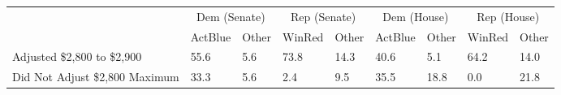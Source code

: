 \begin{tabular}{lll|ll|ll|ll}
  & \multicolumn{2}{c}{Dem (Senate)}& \multicolumn{2}{c}{Rep (Senate)}& \multicolumn{2}{c}{Dem (House)}& \multicolumn{2}{c}{Rep (House)}\\  & ActBlue & Other & WinRed & Other & ActBlue & Other & WinRed & Other \\ 
  \midrule
Adjusted \$2,800 to \$2,900 & 55.6 & 5.6 & 73.8 & 14.3 & 40.6 & 5.1 & 64.2 & 14.0 \\ 
  Did Not Adjust \$2,800 Maximum & 33.3 & 5.6 & 2.4 & 9.5 & 35.5 & 18.8 & 0.0 & 21.8 \\ 
  \end{tabular}
